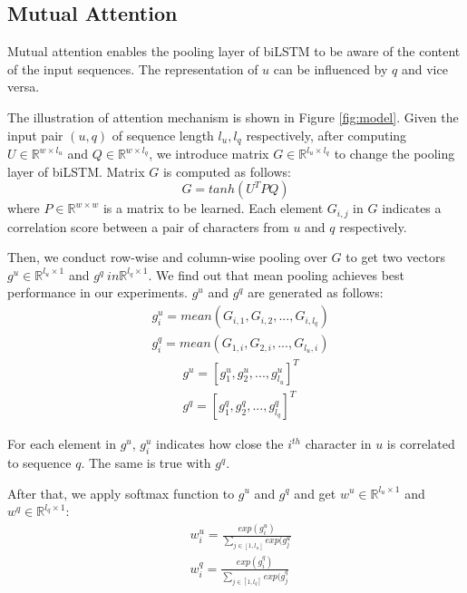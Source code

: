 \documentclass[a4paper,10pt]{article}
\begin{document}
\subsection{Mutual Attention}
\par Mutual attention enables the pooling layer of biLSTM to be aware of the content of the input sequences. The representation of $u$ can be influenced by $q$ and vice versa.
\par The illustration of attention mechanism is shown in Figure \ref{fig:model}. Given the input pair $(u,q)$ of sequence length $l_u, l_q$ respectively, after computing $U\in \mathbb{R}^{w\times{l_u}}$ and $Q\in \mathbb{R}^{w\times{l_q}}$, we introduce matrix $G \in \mathbb{R}^{l_u \times l_q}$ to change the pooling layer of biLSTM. Matrix $G$ is computed as follows:
\begin{equation}
G = tanh(U^TPQ)
\end{equation}
where $P \in \mathbb{R}^{w\times w}$ is a matrix to be learned. Each element $G_{i,j}$ in $G$ indicates a correlation score between a pair of characters from $u$ and $q$ respectively.
\par Then, we conduct row-wise and column-wise pooling over $G$ to get two vectors $g^u \in \mathbb{R}^{l_u \times 1}$ and $g^q \ in \mathbb{R}^{l_q \times 1}$. We find out that mean pooling achieves best performance in our experiments. $g^u$ and $g^q$ are generated as follows:
\begin{equation}
\begin{aligned}
    &g^u_i = mean{(G_{i,1},G_{i,2},...,G_{i,l_q})} \\
    &g^q_i = mean{(G_{1,i},G_{2,i},...,G_{l_u,i})}
\end{aligned}
\end{equation}
\begin{equation}
    \begin{aligned}
        &g^u=[g^u_1,g^u_2,...,g^u_{l_u}]^T \\
        &g^q=[g^q_1,g^q_2,...,g^q_{l_q}]^T
    \end{aligned}
\end{equation}
\par For each element in $g^u$, $g^u_i$ indicates how close the $i^{th}$ character in $u$ is correlated to sequence $q$. The same is true with $g^q$.
\par After that, we apply softmax function to $g^u$ and $g^q$ and get $w^u \in \mathbb{R}^{l_u \times 1}$ and $w^q \in \mathbb{R}^{l_q \times 1}$:
\begin{equation}
    \begin{aligned}
    &w^u_i = \frac{exp(g^u_i)}{\sum_{j\in [1,l_u]}exp(g^u_j} \\
    &w^q_i = \frac{exp(g^q_i)}{\sum_{j\in [1,l_q]}exp(g^q_j}
    \end{aligned}
\end{equation}
\end{document}
